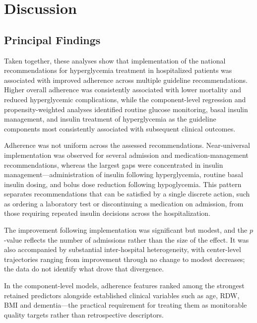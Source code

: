 \section{Discussion}
\label{sec:discussion}

\subsection{Principal Findings}

Taken together, these analyses show that implementation of the national
recommendations for hyperglycemia treatment in hospitalized patients was
associated with improved adherence across multiple guideline
recommendations. Higher overall adherence was consistently associated with
lower mortality and reduced hyperglycemic complications, while the
component-level regression and propensity-weighted analyses identified
routine glucose monitoring, basal insulin management, and insulin treatment
of hyperglycemia as the guideline components most consistently associated
with subsequent clinical outcomes.

Adherence was not uniform across the assessed recommendations. Near-universal
implementation was observed for several admission and medication-management
recommendations, whereas the largest gaps were concentrated in insulin
management---administration of insulin following hyperglycemia, routine
basal insulin dosing, and bolus dose reduction following hypoglycemia. This
pattern separates recommendations that can be satisfied by a single
discrete action, such as ordering a laboratory test or discontinuing a
medication on admission, from those requiring repeated insulin decisions
across the hospitalization.

The improvement following implementation was significant but modest, and the
$p$-value reflects the number of admissions rather than the size of the
effect. It was also accompanied by substantial inter-hospital heterogeneity,
with center-level trajectories ranging from improvement through no change to
modest decreases; the data do not identify what drove that divergence.

In the component-level models, adherence features ranked among the strongest
retained predictors alongside established clinical variables such as age,
RDW, BMI and dementia---the practical requirement for treating them as
monitorable quality targets rather than retrospective descriptors.

